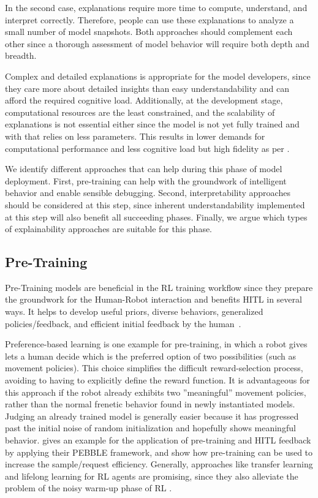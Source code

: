 \documentclass[twoside,11pt]{article}
\begin{document}
\begin{enumerate}
In the second case, explanations require more time to compute, understand, and interpret correctly. Therefore, people can use these explanations to analyze a small number of model snapshots.
Both approaches should complement each other since a thorough assessment of model behavior will require both depth and breadth.

Complex and detailed explanations is appropriate for the model developers, since they care more about detailed insights than easy understandability and can afford the required cognitive load. Additionally, at the development stage, computational resources are the least constrained, and the scalability of explanations is not essential either since the model is not yet fully trained and with that relies on less parameters. This results in lower demands for computational performance and less cognitive load but high fidelity as per \citet{milani2022survey}.

We identify different approaches that can help during this phase of model deployment. First, pre-training can help with the groundwork of intelligent behavior and enable sensible debugging. Second, interpretability approaches should be considered at this step, since inherent understandability implemented at this step will also benefit all succeeding phases. Finally, we argue which types of explainability approaches are suitable for this phase.

\subsection{Pre-Training}
Pre-Training models are beneficial in the RL training workflow since they prepare the groundwork for the Human-Robot interaction and benefits HITL in several ways. It helps to 
develop useful priors, diverse behaviors, generalized policies/feedback, and efficient initial feedback by the human~\citep{daniel2016hierarchical,eysenbach2018diversity,florensa2017stochastic,hazan2019provably,LeeSmithAbbeel:2021:FeedbackPreferenceHITLLearningPEBBLE}.

Preference-based learning is one example for pre-training, in which a robot gives lets a human decide which is the preferred option of two possibilities (such as movement policies). This choice simplifies the difficult reward-selection process, avoiding to having to explicitly define the reward function. It is advantageous for this approach if the robot already exhibits two ''meaningful'' movement policies, rather than the normal frenetic behavior found in newly instantiated models.
Judging an already trained model is generally easier because it has progressed past the initial noise of random initialization and hopefully shows meaningful behavior. \citet{LeeSmithAbbeel:2021:FeedbackPreferenceHITLLearningPEBBLE} gives an example for the application of pre-training and HITL feedback by applying their PEBBLE framework, and show how pre-training can be used to increase the sample/request efficiency.
Generally, approaches like transfer learning and lifelong learning for RL agents are promising, since they also alleviate the problem of the noisy warm-up phase of RL \citep{taylor2009transfer,yang2021efficient}.


\end{enumerate}
\end{document}
